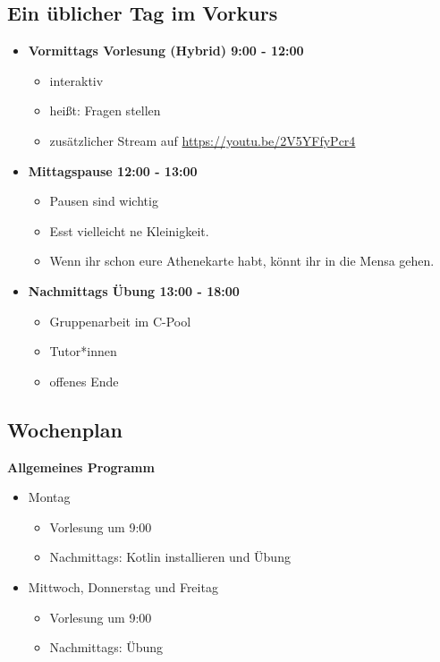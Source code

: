 \subsection{Ein üblicher Tag im Vorkurs}
\begin{frame}
    \slidehead
    \begin{itemize}
        \item \textbf{Vormittags Vorlesung (Hybrid) 9:00 - 12:00}
            \begin{itemize}
                \item interaktiv
                \item heißt: Fragen stellen
                \item zusätzlicher Stream auf \href{https://youtu.be/2V5YFfyPcr4}{https://youtu.be/2V5YFfyPcr4}
            \end{itemize}
            \pause
        \item \textbf{Mittagspause 12:00 - 13:00}
            \begin{itemize}
                \item Pausen sind wichtig
                \item Esst vielleicht ne Kleinigkeit.
                \item Wenn ihr schon eure Athenekarte habt, könnt ihr in die Mensa gehen.
            \end{itemize}
            \pause
        \item \textbf{Nachmittags Übung 13:00 - 18:00}
            \begin{itemize}
                \item Gruppenarbeit im C-Pool
                \item Tutor*innen
                \item offenes Ende
            \end{itemize}
    \end{itemize}
\end{frame}

\subsection{Wochenplan}
\begin{frame}
    \slidehead
    \textbf{Allgemeines Programm}
    \begin{itemize}
        \item Montag
            \begin{itemize}
                \item Vorlesung um 9:00
                \item Nachmittags: Kotlin installieren und Übung
            \end{itemize}
            \pause
        \item Mittwoch, Donnerstag und Freitag
            \begin{itemize}
                \item Vorlesung um 9:00
                \item Nachmittags: Übung
            \end{itemize}
    \end{itemize}
\end{frame}

